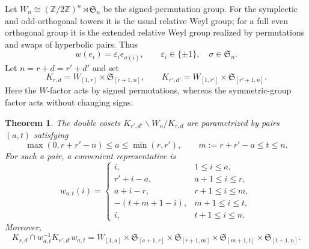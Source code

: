 \documentclass[12pt]{amsart}
\numberwithin{itemcounter}{subsection}
\theoremstyle{plain}
\newtheorem{theorem}{Theorem}[section]
\theoremstyle{definition}
\theoremstyle{remark}
\numberwithin{equation}{section}
\def\min{{\operatorname{min}\nolimits}}
\begin{document}
Let $W_n\cong (\mathbb Z/2\mathbb Z)^n\rtimes\mathfrak S_n$ be the signed-permutation group.  For the symplectic and odd-orthogonal towers it is the usual relative Weyl group; for a full even orthogonal group it is the extended relative Weyl group realized by permutations and swaps of hyperbolic pairs. Thus
\[
w(e_i)=\varepsilon_i e_{\sigma(i)},\qquad
\varepsilon_i\in\{\pm1\},\quad \sigma\in\mathfrak S_n.
\]
Let $n=r+d=r'+d'$ and set
\[
K_{r,d}=W_{[1,r]}\times\mathfrak S_{[r+1,n]},
\qquad
K_{r',d'}=W_{[1,r']}\times\mathfrak S_{[r'+1,n]}.
\]
Here the $W$-factor acts by signed permutations, whereas the symmetric-group factor acts without changing signs.

\begin{theorem}\label{Prop:TypeBC}
The double cosets $K_{r',d'}\backslash W_n/K_{r,d}$ are parametrized by pairs $(a,t)$ satisfying
\[
\max(0,r+r'-n)\le a\le \min(r,r'),
\qquad
m:=r+r'-a\le t\le n.
\]
For such a pair, a convenient representative is
\[
w_{a,t}(i)=
\begin{cases}
 i, & 1\le i\le a,\\
 r'+i-a, & a+1\le i\le r,\\
 a+i-r, & r+1\le i\le m,\\
 -(t+m+1-i), & m+1\le i\le t,\\
 i, & t+1\le i\le n.
\end{cases}
\]
Moreover,
\[
K_{r,d}\cap w_{a,t}^{-1}K_{r',d'}w_{a,t}
=
W_{[1,a]}
\times\mathfrak S_{[a+1,r]}
\times\mathfrak S_{[r+1,m]}
\times\mathfrak S_{[m+1,t]}
\times\mathfrak S_{[t+1,n]}.
\]
\end{theorem}
\end{document}
